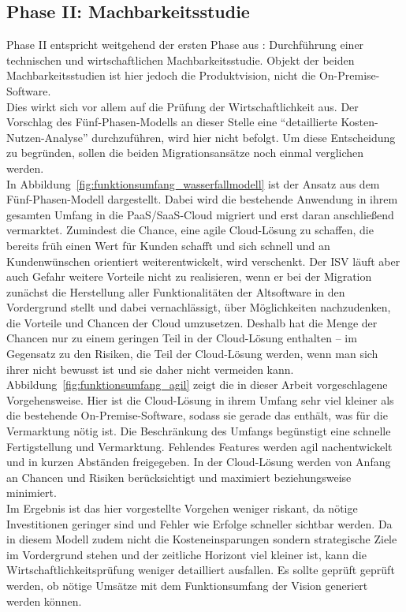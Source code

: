 \subsection{Phase II: Machbarkeitsstudie}
Phase II entspricht weitgehend der ersten Phase aus : 
Durchführung einer technischen und wirtschaftlichen Machbarkeitsstudie. Objekt 
der beiden Machbarkeitsstudien ist hier jedoch die Produktvision, nicht die 
On-Premise-Software.\\
Dies wirkt sich vor allem auf die Prüfung der Wirtschaftlichkeit aus. Der 
Vorschlag des Fünf-Phasen-Modells an dieser Stelle eine "`detaillierte 
Kosten-Nutzen-Analyse"' durchzuführen, wird hier nicht 
befolgt. Um diese Entscheidung zu begründen, sollen die beiden 
Migrationsansätze noch einmal verglichen werden.\\

In Abbildung~\ref{fig:funktionsumfang_wasserfallmodell} ist der Ansatz aus dem 
Fünf-Phasen-Modell dargestellt. Dabei wird die bestehende Anwendung in ihrem 
gesamten Umfang in die PaaS/SaaS-Cloud migriert und erst daran anschließend 
vermarktet. Zumindest die Chance, eine agile Cloud-Lösung zu schaffen, die 
bereits früh einen Wert für Kunden schafft und sich schnell und an 
Kundenwünschen orientiert weiterentwickelt, wird verschenkt. Der ISV 
läuft aber auch Gefahr weitere Vorteile nicht zu realisieren, wenn er bei der 
Migration zunächst die Herstellung aller Funktionalitäten der Altsoftware in 
den Vordergrund stellt und dabei vernachlässigt, über Möglichkeiten 
nachzudenken, die Vorteile und Chancen der Cloud umzusetzen. Deshalb hat die 
Menge der Chancen nur zu einem geringen Teil in der Cloud-Lösung enthalten -- 
im Gegensatz zu den Risiken, die Teil der Cloud-Lösung werden, wenn man sich 
ihrer nicht bewusst ist und sie daher nicht vermeiden kann. \\
Abbildung~\ref{fig:funktionsumfang_agil} zeigt die in dieser Arbeit 
vorgeschlagene Vorgehensweise. Hier ist die Cloud-Lösung in ihrem Umfang sehr 
viel kleiner als die bestehende On-Premise-Software, sodass sie gerade das 
enthält, was für die Vermarktung nötig ist. Die Beschränkung des Umfangs 
begünstigt eine schnelle Fertigstellung und Vermarktung. Fehlendes Features 
werden agil nachentwickelt und in kurzen Abständen freigegeben. In der 
Cloud-Lösung werden von Anfang an Chancen und Risiken berücksichtigt und 
maximiert beziehungsweise minimiert. \\

Im Ergebnis ist das hier vorgestellte Vorgehen weniger riskant, da nötige 
Investitionen geringer sind und Fehler wie Erfolge schneller sichtbar werden. 
Da in diesem Modell zudem nicht die Kosteneinsparungen sondern strategische 
Ziele im Vordergrund stehen und der zeitliche Horizont viel kleiner ist, kann 
die Wirtschaftlichkeitsprüfung weniger detailliert ausfallen. Es sollte geprüft 
geprüft werden, ob nötige Umsätze mit dem Funktionsumfang der Vision generiert 
werden können. \\

